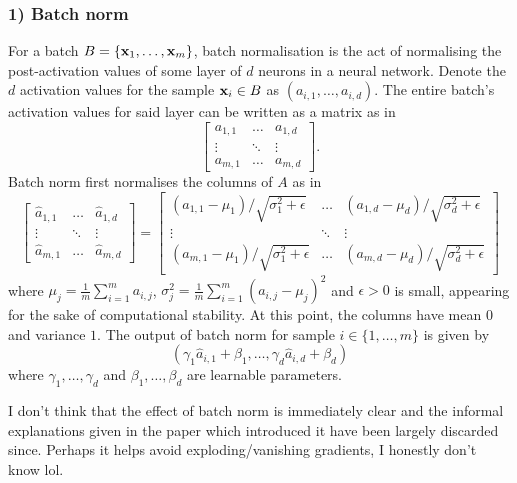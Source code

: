 \documentclass[11pt]{article}
\begin{document}
\subsubsection*{1) Batch norm}
For a batch $B=\{\mathbf{x}_1,\dots,\mathbf{x}_m\}$, batch normalisation is the act of normalising the post-activation values of some layer of $d$ neurons in a neural network. Denote the $d$ activation values for the sample $\mathbf{x}_i\in B$ as $(a_{i,1},\dots,a_{i,d})$. The entire batch's activation values for said layer can be written as a matrix as in
$$
\begin{bmatrix}
    a_{1,1} & \dots  & a_{1,d}\\
    \vdots  & \ddots & \vdots \\
    a_{m,1} & \dots  & a_{m,d}
\end{bmatrix}.
$$
Batch norm first normalises the columns of $A$ as in
$$
\begin{bmatrix}
    \hat{a}_{1,1} & \dots  & \hat{a}_{1,d}\\
    \vdots        & \ddots & \vdots       \\
    \hat{a}_{m,1} & \dots  & \hat{a}_{m,d}
\end{bmatrix}
=
\begin{bmatrix}
    (a_{1,1}-\mu_1) / \sqrt{\sigma_1^2+\epsilon} & \dots & (a_{1,d}-\mu_d) / \sqrt{\sigma_d^2+\epsilon}\\
    \vdots & \ddots & \vdots \\
    (a_{m,1}-\mu_1) / \sqrt{\sigma_1^2+\epsilon} & \dots & (a_{m,d}-\mu_d) / \sqrt{\sigma_d^2+\epsilon}
\end{bmatrix}
$$
where $\mu_j=\frac{1}{m}\sum_{i=1}^ma_{i,j}$, $\sigma_j^2=\frac{1}{m}\sum_{i=1}^m(a_{i,j}-\mu_j)^2$ and $\epsilon>0$ is small, appearing for the sake of computational stability. At this point, the columns have mean $0$ and variance $1$. The output of batch norm for sample $i\in\{1,\dots,m\}$ is given by
$$
(\gamma_1\hat{a}_{i,1}+\beta_1,\dots,\gamma_d\hat{a}_{i,d}+\beta_d)
$$
where $\gamma_1,\dots,\gamma_d$ and $\beta_1,\dots,\beta_d$ are learnable parameters.

I don't think that the effect of batch norm is immediately clear and the informal explanations given in the paper which introduced it have been largely discarded since. Perhaps it helps avoid exploding/vanishing gradients, I honestly don't know lol.
\end{document}
